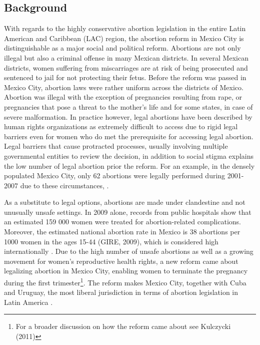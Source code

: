 \documentclass[a4paper, 11pt]{article}
\begin{document}
\begin{spacing}{1.5}
\begin{multicols}{2}
 \subsection{Background}
 With regards to the highly conservative abortion legislation in the entire Latin American and Caribbean (LAC) region, the abortion reform in Mexico City is distinguishable as a major social and political reform. Abortions are not only illegal but also a criminal offense in many Mexican districts. In several Mexican districts, women suffering from miscarriages are at risk of being prosecuted and sentenced to jail for not protecting their fetus. Before the reform was passed in Mexico City, abortion laws were rather uniform across the districts of Mexico.  Abortion was illegal with the exception of pregnancies resulting from rape, or pregnancies that pose a threat to the mother's life and for some states, in case of severe malformation. In practice however, legal abortions have been described by human rights organizations as extremely difficult to access due to rigid legal barriers even for women who do met the prerequisite for accessing legal abortion. Legal barriers that cause protracted processes, usually involving multiple governmental entities to review the decision, in addition to social stigma explains the low number of legal abortion prior the reform. For an example, in the densely populated Mexico City, only 62 abortions were legally performed during 2001-2007 due to these circumstances,  \cite{Becker}. 
 
 As a substitute to legal options, abortions are made under clandestine and not unusually unsafe settings. In 2009 alone, records from public hospitals show that an estimated 159 000 women were treated for abortion-related complications. Moreover, the estimated national abortion rate in Mexico is 38 abortions per 1000 women in the ages 15-44 (GIRE, 2009), which is considered high internationally \cite{Becker}. Due to the high number of unsafe abortions as well as a growing movement for women's reproductive health rights, a new reform came about legalizing abortion in Mexico City, enabling women to terminate the pregnancy during the first trimester\footnote{For a broader discussion on how the reform came about see Kulczycki (2011)}. The reform makes Mexico City, together with Cuba and Uruguay, the most liberal jurisdiction in terms of abortion legislation in Latin America \citep{Fraser}. 
 

\end{multicols}
\end{spacing}
\end{document}
